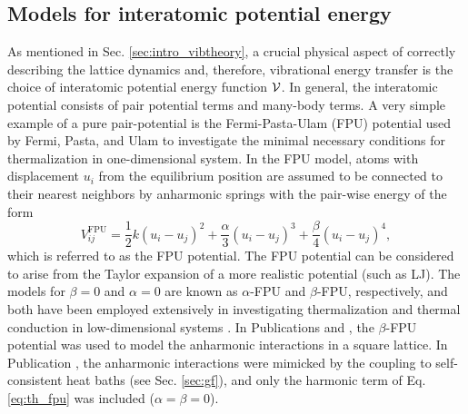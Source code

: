 \subsection{Models for interatomic potential energy}
\label{sec:th_interatomicpotential}


As mentioned in Sec. \ref{sec:intro_vibtheory}, a crucial physical aspect of correctly describing the lattice dynamics and, therefore, vibrational energy transfer is the choice of interatomic potential energy function $\mathcal{V}$. In general, the interatomic potential consists of pair potential terms and many-body terms. 
A very simple example of a pure pair-potential is the Fermi-Pasta-Ulam (FPU) potential used by Fermi, Pasta, and Ulam to investigate the minimal necessary conditions for thermalization in one-dimensional system. In the FPU model, atoms with displacement $u_i$ from the equilibrium position are assumed to be connected to their nearest neighbors by anharmonic springs with the pair-wise energy of the form
\begin{equation}
  V_{ij}^{\textrm{FPU}} = \frac{1}{2} k (u_i-u_j)^2 + \frac{\alpha}{3} (u_i-u_j)^3+ \frac{\beta}{4} (u_i-u_j)^4, \label{eq:th_fpu}
\end{equation}
which is referred to as the FPU potential. The FPU potential can be considered to arise from the Taylor expansion of a more realistic potential (such as LJ). The models for $\beta=0$ and $\alpha=0$ are known as $\alpha$-FPU and $\beta$-FPU, respectively, and both have been employed extensively in investigating thermalization and thermal conduction in low-dimensional systems \cite{}. In Publications  and , the $\beta$-FPU potential was used to model the anharmonic interactions in a square lattice. In Publication , the anharmonic interactions were mimicked by the coupling to self-consistent heat baths (see Sec. \ref{sec:gf}), and only the harmonic term of Eq. \eqref{eq:th_fpu} was included ($\alpha=\beta=0$).

